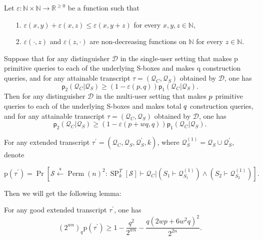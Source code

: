 \begin{lemma}
	\label{lemma:point-wise}
	
	Let $\varepsilon : \mathbb{N} \times \mathbb{N} \rightarrow \mathbb{R}^{\geq 0}$ be a function such that
	\begin{itemize}
		\item[1.]
		$\varepsilon (x, y) + \varepsilon (x, z) \leq \varepsilon (x, y + z)$ for every $x, y, z \in \mathbb{N}$,
		\item[2.]
		$\varepsilon (\cdot, z)$ and $\varepsilon (z, \cdot)$ are non-decreasing functions on $\mathbb{N}$ for every $z \in \mathbb{N}$.
	\end{itemize}
	Suppose that for any distinguisher $\mathcal{D}$ in the single-user setting that makes p primitive queries to each of the underlying S-boxes and makes q construction queries, and for any attainable transcript $\tau = (\mathcal{Q}_C, \mathcal{Q}_S)$ obtained by $\mathcal{D}$, one has
	$$
	\mathsf{p}_{2}\left(\mathcal{Q}_{C} | \mathcal{Q}_{S}\right) \geq (1 - \varepsilon(p,q)) \mathsf{p}_{1}\left(\mathcal{Q}_{C} | \mathcal{Q}_{S}\right).
	$$
	Then for any distinguisher $\mathcal{D}$ in the multi-user setting that makes $\mathnormal{p}$ primitive queries to each of the underlying S-boxes and makes total $\mathnormal{q}$ construction queries, and for any attainable transcript $\tau = (\mathcal{Q}_C, \mathcal{Q}_S)$ obtained by $\mathcal{D}$, one has
	$$
	\mathsf{p}_{2}\left(\mathcal{Q}_{C} | \mathcal{Q}_{S}\right) \geq (1 - \varepsilon(p + wq,q)) \mathsf{p}_{1}\left(\mathcal{Q}_{C} | \mathcal{Q}_{S}\right).
	$$
\end{lemma}







For any extended transcript $\tau^{\prime} = (\mathcal{Q}_C, \mathcal{Q}_S, \mathcal{Q}_S^{\prime},k)$, where $\mathcal{Q}_{S}^{(1)} = \mathcal{Q}_S \cup \mathcal{Q}_S^{\prime}$, denote

$$
\mathrm{p}\left(\tau^{\prime}\right)=\operatorname{Pr}\left[\mathcal{S} \stackrel{\mathrm{s}}{\leftarrow} \operatorname{Perm}(n)^{2}: \mathrm{\operatorname{SP}}^{T}_{k}[\mathcal{S}] \vdash \mathcal{Q}_{C} |\left(S_{1} \vdash \mathcal{Q}_{S_{1}}^{(1)}\right) \wedge\left(S_{2} \vdash \mathcal{Q}_{S_{2}}^{(1)}\right)\right].
$$

Then we will get the following lemma:

\begin{lemma}
\label{lemma:ratio-2-rounds}

For any good extended transcript $\tau^{\prime}$, one has
$$
\left(2^{w n}\right)_{q} \mathrm{p}\left(\tau^{\prime}\right) \geq 1-\frac{q^{2}}{2^{w n}}-\frac{q\left(2 w p+6 w^{2} q\right)^{2}}{2^{2 n}}.
$$
\end{lemma}


